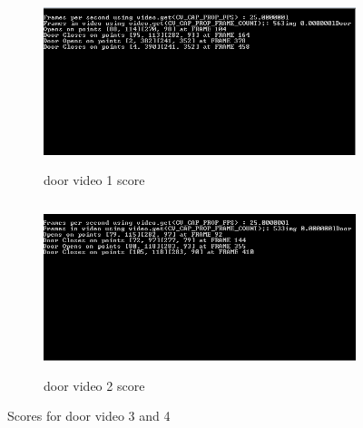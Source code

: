 \documentclass{article}
\begin{document}
\begin{figure}[H]
	\begin{subfigure}{0.5\textwidth}
		\includegraphics[width=1\linewidth, height=5cm]{door2_score.PNG} 
		\caption{door video 1 score}
		\label{fig:subim1}
	\end{subfigure}
	\begin{subfigure}{0.5\textwidth}
		\includegraphics[width=1\linewidth, height=5cm]{door1_score.PNG}
		\caption{door video 2 score}
		\label{fig:subim2}
	\end{subfigure}
	\caption{Scores for door video 3 and 4}
	\label{fig:image2}
\end{figure}
\end{document}
